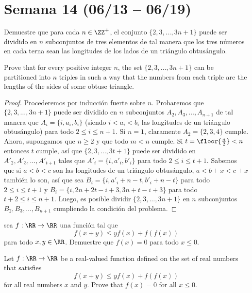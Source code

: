 \section{Semana 14 (06/13 -- 06/19)}


\begin{probHR}[ISL 2011/A5]
  Demuestre que para cada $n\in\ZZ^+$, el conjunto $\{2,3,\dots,3n+1\}$ puede
  ser dividido en $n$ subconjuntos de tres elementos de tal manera que los tres
  números en cada terna sean las longitudes de los lados de un triángulo
  obtusángulo.
  \begin{hint}
    Prove that for every positive integer $n$, the set $\{2,3,\dots,3n+1\}$ can
    be partitioned into $n$ triples in such a way that the numbers from each
    triple are the lengths of the sides of some obtuse triangle.
  \end{hint}
\end{probHR}

\begin{proof}
  Procederemos por inducción fuerte sobre $n$. Probaremos que
  $\{2,3,\dots,3n+1\}$ puede ser dividido en $n$ subconjuntos
  $A_2,A_3,\dots,A_{n+1}$ de tal manera que $A_i=\{i,a_i,b_i\}$ (siendo
  $i<a_i<b_i$ las longitudes de un triángulo obtusángulo) para todo
  $2\le i\le n+1$. Si $n=1$, claramente $A_2=\{2,3,4\}$ cumple. Ahora,
  supongamos que $n\ge 2$ y que todo $m<n$ cumple. Si $t=\floor{\frac n2}<n$
  entonces $t$ cumple, así que $\{2,3,\dots,3t+1\}$ puede ser dividido en
  $A'_2,A'_3,\dots,A'_{t+1}$ tales que $A'_i=\{i,a'_i,b'_i\}$ para todo
  $2\le i\le t+1$. Sabemos que si $a<b<c$ son las longitudes de un triángulo
  obtusángulo, $a<b+x<c+x$ también lo son, así que sea
  $B_i=\{i,a'_i+n-t,b'_i+n-t\}$ para todo $2\le i\le t+1$ y
  $B_i=\{i,2n+2t-i+3,3n+t-i+3\}$ para todo $t+2\le i\le n+1$. Luego, es posible
  dividir $\{2,3,\dots,3n+1\}$ en $n$ subconjuntos $B_2,B_3,\dots,B_{n+1}$
  cumpliendo la condición del problema.
\end{proof}


\begin{probEG}[ISL 2011/A6]
  sea $f:\RR\to\RR$ una función tal que
  \[f(x+y)\le yf(x)+f(f(x))\]
  para todo $x,y\in\RR$. Demuestre que $f(x)=0$ para todo $x\le 0$.
  \begin{hint}
    Let $f:\RR\to\RR$ be a real-valued function defined on the set of real
    numbers that satisfies
    \[f(x+y)\le yf(x)+f(f(x))\]
    for all real numbers $x$ and $y$. Prove that $f(x)=0$ for all $x\le 0$.
  \end{hint}
\end{probEG}


